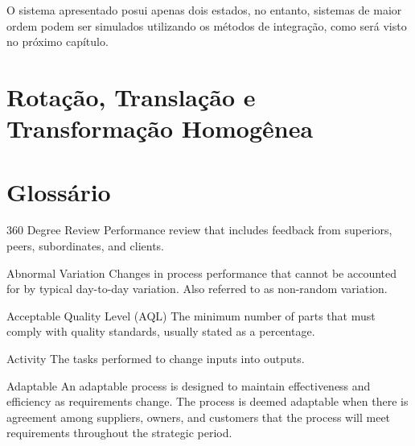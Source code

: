 O sistema apresentado posui apenas dois estados, no entanto, sistemas de maior ordem podem ser 
simulados utilizando os métodos de integração, como será visto no próximo capítulo.


\section{Rotação, Translação e Transformação Homogênea}\label{rotacao}
 
\section{Glossário}
\begin{Glossary}
\item[360 Degree Review] Performance review that includes feedback from superiors, peers, subordinates, and clients.
\item[Abnormal Variation] Changes in process performance that cannot be accounted for by typical day-to-day variation. Also referred to as
non-random variation.
\item[Acceptable Quality Level (AQL)] The minimum number of parts that must comply with quality standards, usually stated as a percentage.
\item[Activity] The tasks performed to change inputs into outputs.
\item[Adaptable] An adaptable process is designed to maintain effectiveness and efficiency as requirements change. The process is
deemed adaptable when there is agreement among suppliers, owners, and customers that the process will meet
requirements throughout the strategic period.
\end{Glossary}



